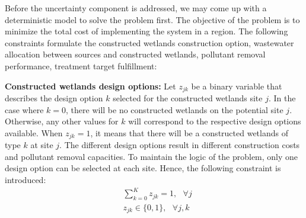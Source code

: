 \documentclass[preprint,12pt,authoryear]{elsarticle}
\begin{document}
Before the uncertainty component is addressed, we may come up with a deterministic model to solve the problem first. The objective of the problem is to minimize the total cost of implementing the system in a region. The following constraints formulate the constructed wetlands construction option, wastewater allocation between sources and constructed wetlands, pollutant removal performance, treatment target fulfillment:

\textbf{Constructed wetlands design options:} Let $z_{jk}$ be a binary variable that describes the design option $k$ selected for the constructed wetlands site $j$. In the case where $k=0$, there will be no constructed wetlands on the potential site $j$. Otherwise, any other values for $k$ will correspond to the respective design options available. When $z_{jk} = 1$, it means that there will be a constructed wetlands of type $k$ at site $j$. The different design options result in different construction costs and pollutant removal capacities. To maintain the logic of the problem, only one design option can be selected at each site. Hence, the following constraint is introduced:
\begin{equation*}
	\begin{split}
	&\sum_{k=0}^{K}z_{jk}=1,~~~\forall j\\
	&z_{jk}\in\{0,1\},~~~\forall j,k
	\end{split}
\end{equation*}
\end{document}
